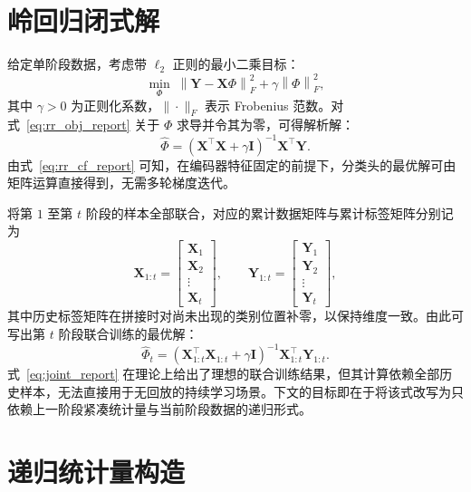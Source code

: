 \section{岭回归闭式解}

给定单阶段数据，考虑带 $\ell_2$ 正则的最小二乘目标：
\begin{equation}
\min_{\Phi}\;\left\|\mathbf{Y}-\mathbf{X}\Phi\right\|_F^2+\gamma\left\|\Phi\right\|_F^2,
\label{eq:rr_obj_report}
\end{equation}
其中 $\gamma>0$ 为正则化系数，$\|\cdot\|_F$ 表示 Frobenius 范数。对式~\eqref{eq:rr_obj_report} 关于 $\Phi$ 求导并令其为零，可得解析解：
\begin{equation}
\widehat{\Phi}=\left(\mathbf{X}^\top\mathbf{X}+\gamma\mathbf{I}\right)^{-1}\mathbf{X}^\top\mathbf{Y}.
\label{eq:rr_cf_report}
\end{equation}
由式~\eqref{eq:rr_cf_report} 可知，在编码器特征固定的前提下，分类头的最优解可由矩阵运算直接得到，无需多轮梯度迭代。

将第 $1$ 至第 $t$ 阶段的样本全部联合，对应的累计数据矩阵与累计标签矩阵分别记为
\begin{equation}
\mathbf{X}_{1:t}=
\begin{bmatrix}
\mathbf{X}_1 \\ \mathbf{X}_2 \\ \vdots \\ \mathbf{X}_t
\end{bmatrix},\qquad
\mathbf{Y}_{1:t}=
\begin{bmatrix}
\mathbf{Y}_1 \\ \mathbf{Y}_2 \\ \vdots \\ \mathbf{Y}_t
\end{bmatrix},
\label{eq:xy_concat_report}
\end{equation}
其中历史标签矩阵在拼接时对尚未出现的类别位置补零，以保持维度一致。由此可写出第 $t$ 阶段联合训练的最优解：
\begin{equation}
\widehat{\Phi}_t=\left(\mathbf{X}_{1:t}^\top\mathbf{X}_{1:t}+\gamma\mathbf{I}\right)^{-1}\mathbf{X}_{1:t}^\top\mathbf{Y}_{1:t}.
\label{eq:joint_report}
\end{equation}
式~\eqref{eq:joint_report} 在理论上给出了理想的联合训练结果，但其计算依赖全部历史样本，无法直接用于无回放的持续学习场景。下文的目标即在于将该式改写为只依赖上一阶段紧凑统计量与当前阶段数据的递归形式。

\section{递归统计量构造}

